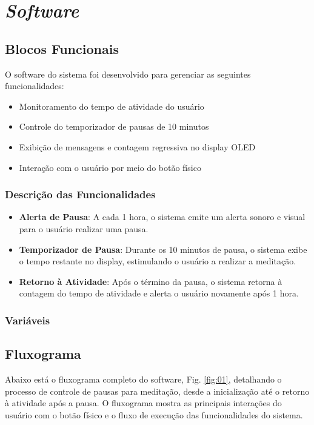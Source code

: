 \documentclass{article}
\begin{document}
\section{\textit{Software}}

\subsection{Blocos Funcionais}
O software do sistema foi desenvolvido para gerenciar as seguintes funcionalidades:
\begin{itemize}
    \item Monitoramento do tempo de atividade do usuário
    \item Controle do temporizador de pausas de 10 minutos
    \item Exibição de mensagens e contagem regressiva no display OLED
    \item Interação com o usuário por meio do botão físico
\end{itemize}
\subsubsection{Descrição das Funcionalidades}
\begin{itemize}
  \item \textbf{Alerta de Pausa}: A cada 1 hora, o sistema emite um alerta sonoro e visual para o usuário realizar uma pausa.
  \item \textbf{Temporizador de Pausa}: Durante os 10 minutos de pausa, o sistema exibe o tempo restante no display, estimulando o usuário a realizar a meditação.
  \item \textbf{Retorno à Atividade}: Após o término da pausa, o sistema retorna à contagem do tempo de atividade e alerta o usuário novamente após 1 hora.
\end{itemize}

\subsubsection{Variáveis}
\subsection{Fluxograma}
Abaixo está o fluxograma completo do software, Fig. \ref{fig:01}, detalhando o processo de controle de pausas para meditação, desde a inicialização até o retorno à atividade após a pausa. O fluxograma mostra as principais interações do usuário com o botão físico e o fluxo de execução das funcionalidades do sistema.
\end{document}
